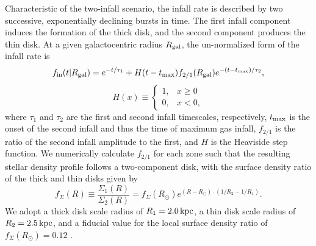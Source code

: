 \documentclass[twocolumn,twocolappendix,linenumbers]{aastex631}
\newcommand{\kpc}{\,{\rm kpc}}
\begin{document}
Characteristic of the two-infall scenario, the infall rate is described by two successive, exponentially declining bursts in time. The first infall component induces the formation of the thick disk, and the second component produces the thin disk. At a given galactocentric radius $R_{\rm gal}$, the un-normalized form of the infall rate is
\begin{equation}
    \label{eq:twoinfall-ifr}
    f_{\rm in}(t|R_{\rm gal}) = e^{-t/\tau_1} + H(t-t_{\rm max}) f_{2/1} (R_{\rm gal}) e^{-(t-t_{\rm max})/\tau_2},
\end{equation}
\begin{equation*}
    H(x) \equiv 
    \begin{cases}
        1, & x \ge 0 \\
        0, & x < 0,
    \end{cases}
\end{equation*}
where $\tau_1$ and $\tau_2$ are the first and second infall timescales, respectively, $t_{\rm max}$ is the onset of the second infall and thus the time of maximum gas infall,  $f_{2/1}$ is the ratio of the second infall amplitude to the first, and $H$ is the Heaviside step function. We numerically calculate $f_{2/1}$ for each zone such that the resulting stellar density profile follows a two-component disk, with the surface density ratio of the thick and thin disks given by
\begin{equation}
    f_\Sigma(R) \equiv \frac{\Sigma_1(R)}{\Sigma_2(R)} = f_\Sigma(R_\odot) e^{(R-R_\odot)\cdot(1/R_2 - 1/R_1)}.
\end{equation}
We adopt a thick disk scale radius of $R_1=2.0\kpc$, a thin disk scale radius of $R_2=2.5\kpc$, and a fiducial value for the local surface density ratio of $f_\Sigma(R_\odot)=0.12$ \citep{bland-hawthorn_galaxy_2016}. 
\end{document}
